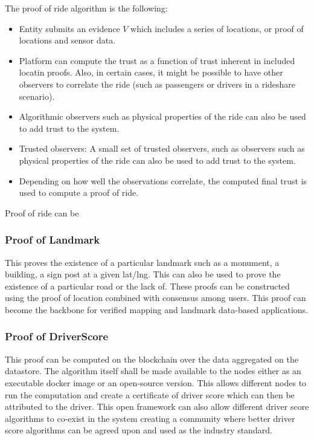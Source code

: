 The proof of ride algorithm is the following:
\begin{itemize}
    \item Entity submits an evidence $V$ which includes a series of locations, or proof of locations and sensor data.
    \item Platform can compute the trust as a function of trust inherent in included locatin proofs. Also, in certain
        cases, it might be possible to have other observers to correlate the ride (such as passengers or drivers in a
        rideshare scenario).
    \item Algorithmic observers such as physical properties of the ride can also be used to add trust to the system.
    \item Trusted observers: A small set of trusted observers, such as observers such as physical properties of the ride can also be used to add trust to the system.
    \item Depending on how well the observations correlate, the computed final trust is used to compute a proof of ride.
\end{itemize}

Proof of ride can be

\subsubsection{Proof of Landmark}

This proves the existence of a particular landmark such as a monument, a building, a
sign post at a given lat/lng. This can also be used to prove the existence of a particular road or the lack of. These
proofs can be constructed using the proof of location combined with consensus among users.  This proof can become the
backbone for verified mapping and landmark data-based applications.

\subsubsection{Proof of DriverScore}

This proof can be computed on the blockchain over the data aggregated on the
datastore. The algorithm itself shall be made available to the nodes either as an executable docker image or an
open-source version. This allows different nodes to run the computation and create a certificate of driver score which
can then be attributed to the driver. This open framework can also allow different driver score algorithms to co-exist
in the system creating a community where better driver score algorithms can be agreed upon and used as the industry
standard.


